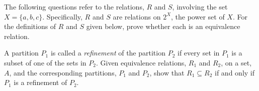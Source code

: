 \documentclass[addpoints]{exam}
\begin{document}
\begin{questions}
\begin{solution}
\end{solution}
\question The following questions refer to the relations, $R$ and $S$, involving the set $X = \{a, b, c\}$. Specifically, $R$ and $S$ are relations on $2^X$, the power set of $X$. For the definitions of $R$ and $S$ given below, prove whether each is an equivalence relation.
  \begin{multicols}{2}
  \end{multicols}
  \begin{solution}
    \begin{parts}
    \part 
    \part 
    \end{parts}
  \end{solution}

\question[5] A partition $P_1$ is called a \textit{refinement} of the partition $P_2$ if every set in $P_1$ is a subset of one of the sets in $P_2$. Given equivalence relations, $R_1$ and $R_2$, on a set, $A$, and the corresponding partitions, $P_1$ and $P_2$, show that $R_1 \subseteq R_2$ if and only if $P_1$ is a refinement of $P_2$.
  \begin{solution}
  \end{solution}


\end{questions}
\end{document}
